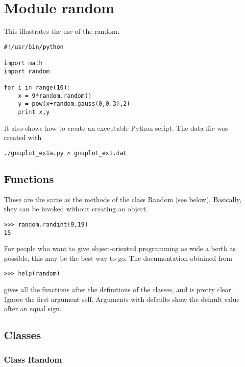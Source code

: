 \documentclass{article}
\begin{document}
\newpage
\section{Module {\ttfamily random}}\label{ap:random}

This illustrates the use of the {\ttfamily random}.
\begin{verbatim}
#!/usr/bin/python

import math
import random

for i in range(10):
    x = 9*random.random()
    y = pow(x+random.gauss(0,0.3),2)
    print x,y
\end{verbatim}
It also shows how to create an executable Python script.  The data file was created
with
\begin{verbatim}
./gnuplot_ex1a.py > gnuplot_ex1.dat
\end{verbatim}

\subsection{Functions}

These are the same as the methods of the class {\ttfamily Random} (see below).
Basically,
they can be invoked without creating an object.
\begin{verbatim}
>>> random.randint(9,19)
15
\end{verbatim}
For people who want to give object-oriented programming as wide a berth as
possible, this may be the best way to go.
The documentation obtained from
\begin{verbatim}
>>> help(random)
\end{verbatim}
gives all the functions after the definitions of the classes, and is pretty clear.
Ignore the first
argument {\ttfamily self}.  Arguments with defaults show the default value
after an equal sign.

\subsection{Classes}

\subsubsection{Class {\ttfamily Random}}
\end{document}
